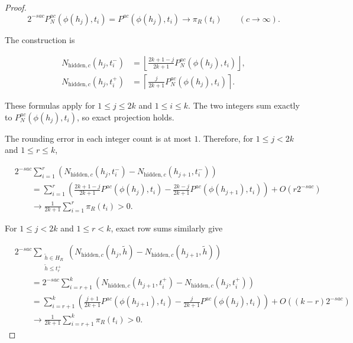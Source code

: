 \documentclass[10pt]{article}
\theoremstyle{definition}
\begin{document}
\begin{proof}
\begin{equation}
 2^{-sac}P_N^{ac}(\phi(h_j),t_i)
 =
 P^{ac}(\phi(h_j),t_i)
 \longrightarrow
 \pi_R(t_i)
 \qquad(c\longrightarrow\infty).
\end{equation}

The construction is

\begin{equation}
 \begin{aligned}
  N_{\mathrm{hidden},c}(h_j,t_i^-)
  &=
  \left\lfloor
   \frac{2k+1-j}{2k+1}P_N^{ac}(\phi(h_j),t_i)
  \right\rfloor,\\
  N_{\mathrm{hidden},c}(h_j,t_i^+)
  &=
  \left\lceil
   \frac{j}{2k+1}P_N^{ac}(\phi(h_j),t_i)
  \right\rceil.
 \end{aligned}
\end{equation}

These formulas apply for $1\le j\le2k$ and $1\le i\le k$.  The two integers
sum exactly to $P_N^{ac}(\phi(h_j),t_i)$, so exact projection holds.

The rounding error in each integer count is at most $1$.  Therefore, for
$1\le j<2k$ and $1\le r\le k$,

\begin{equation}
 \begin{aligned}
  &2^{-sac}
  \sum_{i=1}^{r}
  \left(
   N_{\mathrm{hidden},c}(h_j,t_i^-)
   -
   N_{\mathrm{hidden},c}(h_{j+1},t_i^-)
  \right)\\
  &\qquad=
  \sum_{i=1}^{r}
  \left(
   \frac{2k+1-j}{2k+1}P^{ac}(\phi(h_j),t_i)
   -
   \frac{2k-j}{2k+1}P^{ac}(\phi(h_{j+1}),t_i)
  \right)
  +O(r2^{-sac})\\
  &\qquad\longrightarrow
  \frac{1}{2k+1}\sum_{i=1}^{r}\pi_R(t_i)>0.
 \end{aligned}
\end{equation}

For $1\le j<2k$ and $1\le r<k$, exact row sums similarly give

\begin{equation}
 \begin{aligned}
  &2^{-sac}
  \sum_{\substack{\widetilde h\in H_R\\\widetilde h\le t_r^+}}
  \left(
   N_{\mathrm{hidden},c}(h_j,\widetilde h)
   -
   N_{\mathrm{hidden},c}(h_{j+1},\widetilde h)
  \right)\\
  &\qquad=
  2^{-sac}
  \sum_{i=r+1}^{k}
  \left(
   N_{\mathrm{hidden},c}(h_{j+1},t_i^+)
   -
   N_{\mathrm{hidden},c}(h_j,t_i^+)
  \right)\\
  &\qquad=
  \sum_{i=r+1}^{k}
  \left(
   \frac{j+1}{2k+1}P^{ac}(\phi(h_{j+1}),t_i)
   -
   \frac{j}{2k+1}P^{ac}(\phi(h_j),t_i)
  \right)
  +O\left((k-r)2^{-sac}\right)\\
  &\qquad\longrightarrow
  \frac{1}{2k+1}\sum_{i=r+1}^{k}\pi_R(t_i)>0.
 \end{aligned}
\end{equation}


\end{proof}
\end{document}
